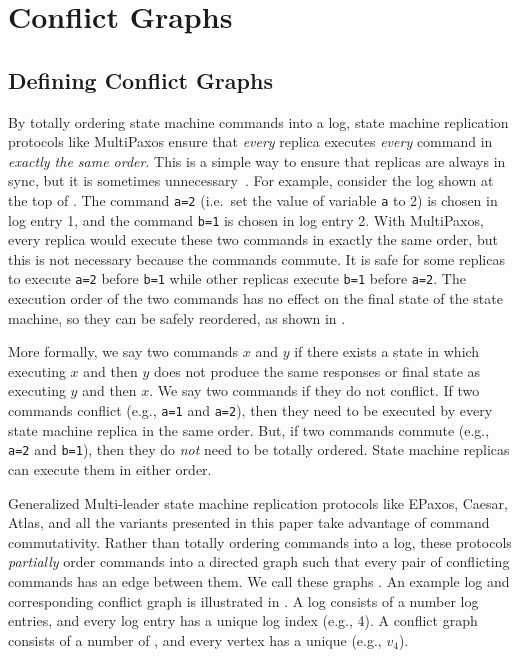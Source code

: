 \section{Conflict Graphs}
\subsection{Defining Conflict Graphs}
By totally ordering state machine commands into a log, state machine
replication protocols like MultiPaxos ensure that \emph{every} replica executes
\emph{every} command in \emph{exactly the same order}. This is a simple way to
ensure that replicas are always in sync, but it is sometimes
unnecessary~\cite{lamport2005generalized}. For example, consider the log shown
at the top of . The command \texttt{a=2} (i.e.\ set the
value of variable \texttt{a} to 2) is chosen in log entry 1, and the command
\texttt{b=1} is chosen in log entry 2. With MultiPaxos, every replica would
execute these two commands in exactly the same order, but this is not necessary
because the commands commute. It is safe for some replicas to execute
\texttt{a=2} before \texttt{b=1} while other replicas execute \texttt{b=1}
before \texttt{a=2}. The execution order of the two commands has no effect on
the final state of the state machine, so they can be safely reordered, as shown
in .

{}

More formally, we say two commands $x$ and $y$  if there
exists a state in which executing $x$ and then $y$ does not produce the same
responses or final state as executing $y$ and then $x$. We say two commands
 if they do not conflict. If two commands conflict (e.g.,
\texttt{a=1} and \texttt{a=2}), then they need to be executed by every state
machine replica in the same order. But, if two commands commute (e.g.,
\texttt{a=2} and \texttt{b=1}), then they do \emph{not} need to be totally
ordered. State machine replicas can execute them in either order.

Generalized Multi-leader state machine replication protocols like EPaxos,
Caesar, Atlas, and all the \BPaxos{} variants presented in this paper take
advantage of command commutativity. Rather than totally ordering commands into
a log, these protocols \emph{partially} order commands into a directed graph
such that every pair of conflicting commands has an edge between them. We call
these graphs . An example log and corresponding
conflict graph is illustrated in . A log consists of a
number log entries, and every log entry has a unique log index (e.g., 4). A
conflict graph consists of a number of , and every vertex has
a unique  (e.g., $v_4$).

